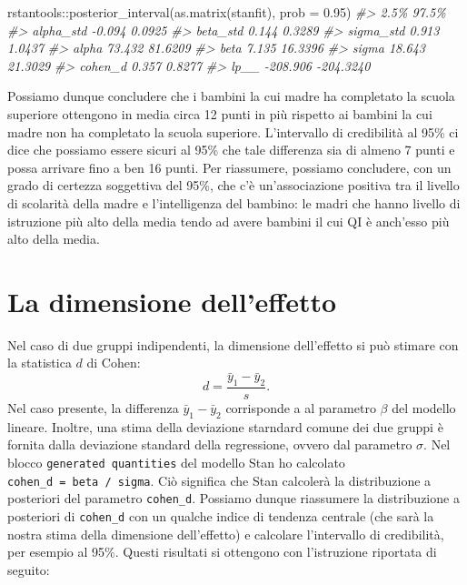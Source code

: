 \documentclass[
  10pt,
  italian,
  a4paper,
  extrafontsizes,onecolumn,openright
  ]{memoir}
\newenvironment{Shaded}{\begin{snugshade}}{\end{snugshade}}
\newcommand{\AttributeTok}[1]{\textcolor[rgb]{0.77,0.63,0.00}{#1}}
\newcommand{\CommentTok}[1]{\textcolor[rgb]{0.56,0.35,0.01}{\textit{#1}}}
\newcommand{\FloatTok}[1]{\textcolor[rgb]{0.00,0.00,0.81}{#1}}
\newcommand{\FunctionTok}[1]{\textcolor[rgb]{0.00,0.00,0.00}{#1}}
\newcommand{\NormalTok}[1]{#1}
\newcommand{\SpecialCharTok}[1]{\textcolor[rgb]{0.00,0.00,0.00}{#1}}
\begin{document}
\begin{Shaded}
\begin{Highlighting}[]
\NormalTok{rstantools}\SpecialCharTok{::}\FunctionTok{posterior\_interval}\NormalTok{(}\FunctionTok{as.matrix}\NormalTok{(stanfit), }\AttributeTok{prob =} \FloatTok{0.95}\NormalTok{)}
\CommentTok{\#\textgreater{}               2.5\%     97.5\%}
\CommentTok{\#\textgreater{} alpha\_std   {-}0.094    0.0925}
\CommentTok{\#\textgreater{} beta\_std     0.144    0.3289}
\CommentTok{\#\textgreater{} sigma\_std    0.913    1.0437}
\CommentTok{\#\textgreater{} alpha       73.432   81.6209}
\CommentTok{\#\textgreater{} beta         7.135   16.3396}
\CommentTok{\#\textgreater{} sigma       18.643   21.3029}
\CommentTok{\#\textgreater{} cohen\_d      0.357    0.8277}
\CommentTok{\#\textgreater{} lp\_\_      {-}208.906 {-}204.3240}
\end{Highlighting}
\end{Shaded}

Possiamo dunque concludere che i bambini la cui madre ha completato la scuola superiore ottengono in media circa 12 punti in più rispetto ai bambini la cui madre non ha completato la scuola superiore. L'intervallo di credibilità al 95\% ci dice che possiamo essere sicuri al 95\% che tale differenza sia di almeno 7 punti e possa arrivare fino a ben 16 punti. Per riassumere, possiamo concludere, con un grado di certezza soggettiva del 95\%, che c'è un'associazione positiva tra il livello di scolarità della madre e l'intelligenza del bambino: le madri che hanno livello di istruzione più alto della media tendo ad avere bambini il cui QI è anch'esso più alto della media.

\hypertarget{la-dimensione-delleffetto}{%
\section{La dimensione dell'effetto}\label{la-dimensione-delleffetto}}

Nel caso di due gruppi indipendenti, la dimensione dell'effetto si può stimare con la statistica \(d\) di Cohen:
\[
d={\frac {{\bar {y}}_{1}-{\bar {y}}_{2}}{s}}.
\]
Nel caso presente, la differenza \({\bar {y}}_{1}-{\bar {y}}_{2}\) corrisponde a al parametro \(\beta\) del modello lineare. Inoltre, una stima della deviazione starndard comune dei due gruppi è fornita dalla deviazione standard della regressione, ovvero dal parametro \(\sigma\). Nel blocco \texttt{generated\ quantities} del modello Stan ho calcolato \texttt{cohen\_d\ =\ beta\ /\ sigma}. Ciò significa che Stan calcolerà la distribuzione a posteriori del parametro \texttt{cohen\_d}. Possiamo dunque riassumere la distribuzione a posteriori di \texttt{cohen\_d} con un qualche indice di tendenza centrale (che sarà la nostra stima della dimensione dell'effetto) e calcolare l'intervallo di credibilità, per esempio al 95\%. Questi risultati si ottengono con l'istruzione riportata di seguito:
\end{document}
